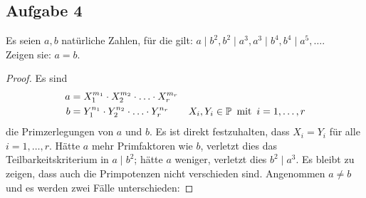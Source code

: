 \subsection{Aufgabe 4}
Es seien $a, b$ natürliche Zahlen, für die gilt:
$a \mid b^2, b^2 \mid a^3, a^3 \mid b^4, b^4 \mid a^5, \dots$.\\
Zeigen sie: $a = b$.
\begin{proof}
  Es sind
  \begin{align*}
    a & = X_1^{m_1} \cdot X_2^{m_2} \cdot \ldots \cdot X_r^{m_r} \\
    b & = Y_1^{n_1} \cdot Y_2^{n_2} \cdot \ldots \cdot Y_r^{n_r}
    \qquad X_i,Y_i \in \mathbb{P}{} \enspace \text{mit} \enspace i = 1,\dotsc,r
  \end{align*}
  die Primzerlegungen von $a$ und $b$. Es ist direkt festzuhalten, dass $X_i = Y_i$ für alle
  $i = 1,\dotsc,r$. Hätte $a$ mehr Primfaktoren wie $b$,
  verletzt dies das Teilbarkeitskriterium \parencite[33]{book:zahlentheorie} in $a \mid b^2$;
  hätte $a$ weniger, verletzt dies $b^2 \mid a^3$.
  Es bleibt zu zeigen, dass auch die Primpotenzen nicht verschieden sind.
  Angenommen $a \neq b$ und es werden zwei Fälle unterschieden:


\end{proof}
